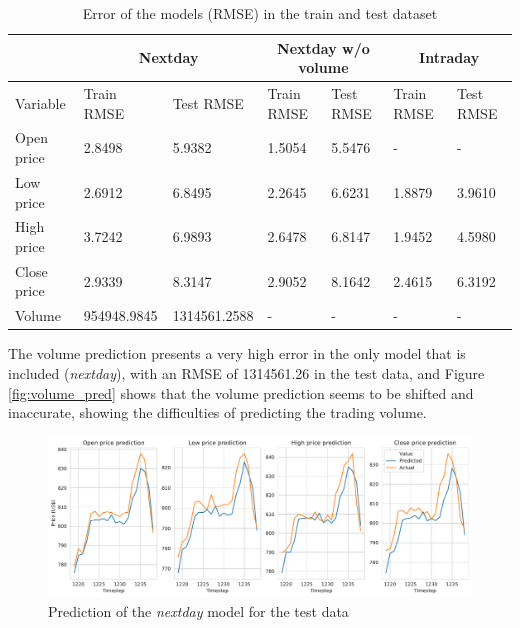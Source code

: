 \documentclass[10pt,twocolumn,letterpaper]{article}
\begin{document}
\begin{table}[h]
	\begin{center}
		\begin{tabular}{|p{1.8cm}|p{2cm}|p{2cm}|p{1.8cm}|p{1.8cm}|p{1.8cm}|p{1.8cm}|}
			\hline
			& \multicolumn{2}{c}{Nextday} & \multicolumn{2}{c}{Nextday w/o volume} & \multicolumn{2}{c|}{Intraday} \\
			\hline
			Variable & Train RMSE & Test RMSE & Train RMSE & Test RMSE & Train RMSE & Test RMSE \\
			\hline\hline
			Open price & 2.8498 & 5.9382 & 1.5054 & 5.5476 & - & - \\
			Low price & 2.6912 & 6.8495 & 2.2645 & 6.6231 & 1.8879 & 3.9610\\
			High price & 3.7242 & 6.9893 & 2.6478 & 6.8147 & 1.9452 & 4.5980 \\
			Close price & 2.9339 & 8.3147 & 2.9052 & 8.1642 & 2.4615 & 6.3192 \\
			Volume & 954948.9845 & 1314561.2588 & - & - & - & - \\
			\hline
		\end{tabular}
	\end{center}
	\caption{Error of the models (RMSE) in the train and test dataset}
	\label{table:error}
\end{table}

The volume prediction presents a very high error in the only model that is included (\textit{nextday}), with an RMSE of 1314561.26 in the test data, and Figure \ref{fig:volume_pred}
 shows that the volume prediction seems to be shifted and inaccurate, showing the difficulties of predicting the trading volume.


\begin{figure}[h]
	\begin{center}
		\includegraphics[width=1\linewidth]{prediction_nextday.pdf}
		\caption{Prediction of the \textit{nextday} model for the test data}
		\label{fig:nextday_pred}
	\end{center}
\end{figure}
\end{document}
